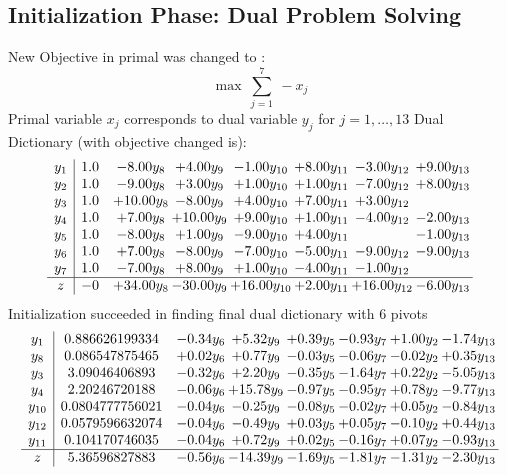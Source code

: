 \documentclass[9pt]{article}
\begin{document}
\subsection{Initialization Phase: Dual Problem Solving}
New Objective in primal was changed to : \[ \max\ \sum_{j=1}^{7}\ - x_j \] 
Primal variable $x_j$ corresponds to dual variable $y_j$ for $j = 1,\ldots,13$
Dual Dictionary (with objective changed is): 
\[\begin{array}{c| c c@{\hskip 2pt} c@{\hskip 2pt} c@{\hskip 2pt} c@{\hskip 2pt} c@{\hskip 2pt} c@{\hskip 2pt} }
 y_{1}   &  1.0 & -8.00 y_{8} & +  4.00 y_{9} & -1.00 y_{10} & +  8.00 y_{11} & -3.00 y_{12} & +  9.00 y_{13}\\
 y_{2}   &  1.0 & -9.00 y_{8} & +  3.00 y_{9} & +  1.00 y_{10} & +  1.00 y_{11} & -7.00 y_{12} & +  8.00 y_{13}\\
 y_{3}   &  1.0 & + 10.00 y_{8} & -8.00 y_{9} & +  4.00 y_{10} & +  7.00 y_{11} & +  3.00 y_{12} &   \\
 y_{4}   &  1.0 & +  7.00 y_{8} & + 10.00 y_{9} & +  9.00 y_{10} & +  1.00 y_{11} & -4.00 y_{12} & -2.00 y_{13}\\
 y_{5}   &  1.0 & -8.00 y_{8} & +  1.00 y_{9} & -9.00 y_{10} & +  4.00 y_{11} &   & -1.00 y_{13}\\
 y_{6}   &  1.0 & +  7.00 y_{8} & -8.00 y_{9} & -7.00 y_{10} & -5.00 y_{11} & -9.00 y_{12} & -9.00 y_{13}\\
 y_{7}   &  1.0 & -7.00 y_{8} & +  8.00 y_{9} & +  1.00 y_{10} & -4.00 y_{11} & -1.00 y_{12} &   \\
\hline
z    &  -0 & + 34.00 y_{8} & -30.00 y_{9} & + 16.00 y_{10} & +  2.00 y_{11} & + 16.00 y_{12} & -6.00 y_{13}\\
\end{array}\]
Initialization succeeded in finding final dual dictionary with 6 pivots
\[\begin{array}{c| c c@{\hskip 2pt} c@{\hskip 2pt} c@{\hskip 2pt} c@{\hskip 2pt} c@{\hskip 2pt} c@{\hskip 2pt} }
 y_{1}   &  0.886626199334 & -0.34 y_{6} & +  5.32 y_{9} & +  0.39 y_{5} & -0.93 y_{7} & +  1.00 y_{2} & -1.74 y_{13}\\
 y_{8}   &  0.086547875465 & +  0.02 y_{6} & +  0.77 y_{9} & -0.03 y_{5} & -0.06 y_{7} & -0.02 y_{2} & +  0.35 y_{13}\\
 y_{3}   &  3.09046406893 & -0.32 y_{6} & +  2.20 y_{9} & -0.35 y_{5} & -1.64 y_{7} & +  0.22 y_{2} & -5.05 y_{13}\\
 y_{4}   &  2.20246720188 & -0.06 y_{6} & + 15.78 y_{9} & -0.97 y_{5} & -0.95 y_{7} & +  0.78 y_{2} & -9.77 y_{13}\\
 y_{10}   &  0.0804777756021 & -0.04 y_{6} & -0.25 y_{9} & -0.08 y_{5} & -0.02 y_{7} & +  0.05 y_{2} & -0.84 y_{13}\\
 y_{12}   &  0.0579596632074 & -0.04 y_{6} & -0.49 y_{9} & +  0.03 y_{5} & +  0.05 y_{7} & -0.10 y_{2} & +  0.44 y_{13}\\
 y_{11}   &  0.104170746035 & -0.04 y_{6} & +  0.72 y_{9} & +  0.02 y_{5} & -0.16 y_{7} & +  0.07 y_{2} & -0.93 y_{13}\\
\hline
z    &  5.36596827883 & -0.56 y_{6} & -14.39 y_{9} & -1.69 y_{5} & -1.81 y_{7} & -1.31 y_{2} & -2.30 y_{13}\\
\end{array}\]
\end{document}
